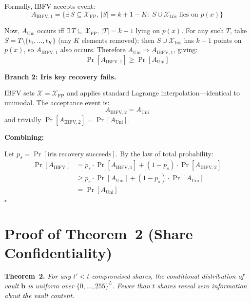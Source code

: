 Formally, IBFV accepts event:
\begin{equation}
  A_\mathrm{IBFV,1} = \{\exists\, S \subseteq \mathcal{X}_{\mathrm{FP}},\,
  |S| = k{+}1{-}K :\; S \cup \mathcal{X}_{\mathrm{Iris}} \text{ lies on } p(x)\}
\end{equation}

Now, $A_\mathrm{Uni}$ occurs iff $\exists\, T \subseteq \mathcal{X}_{\mathrm{FP}},\,
|T| = k{+}1$ lying on $p(x)$. For any such $T$, take $S = T \setminus
\{t_1, \ldots, t_K\}$ (any $K$ elements removed); then $S \cup
\mathcal{X}_{\mathrm{Iris}}$ has $k{+}1$ points on $p(x)$, so $A_\mathrm{IBFV,1}$
also occurs. Therefore $A_\mathrm{Uni} \Rightarrow A_\mathrm{IBFV,1}$, giving:
\begin{equation}
  \Pr[A_\mathrm{IBFV,1}] \geq \Pr[A_\mathrm{Uni}]
\end{equation}

\textbf{Branch 2: Iris key recovery fails.}

IBFV sets $\mathcal{X} = \mathcal{X}_{\mathrm{FP}}$ and applies standard
Lagrange interpolation---identical to unimodal. The acceptance event is:
\begin{equation}
  A_\mathrm{IBFV,2} = A_\mathrm{Uni}
\end{equation}
and trivially $\Pr[A_\mathrm{IBFV,2}] = \Pr[A_\mathrm{Uni}]$.

\textbf{Combining:}

Let $p_s = \Pr[\text{iris recovery succeeds}]$. By the law of total probability:
\begin{align}
  \Pr[A_\mathrm{IBFV}] &= p_s \cdot \Pr[A_\mathrm{IBFV,1}] +
  (1{-}p_s) \cdot \Pr[A_\mathrm{IBFV,2}] \\
  &\geq p_s \cdot \Pr[A_\mathrm{Uni}] + (1{-}p_s) \cdot \Pr[A_\mathrm{Uni}] \\
  &= \Pr[A_\mathrm{Uni}]
\end{align}
\hfill$\square$

\section{Proof of Theorem~2 (Share Confidentiality)}
\label{sec:proof_thm2}

\noindent\textbf{Theorem~2.} \textit{For any $t' < t$ compromised shares, the
conditional distribution of vault $\mathbf{b}$ is uniform over
$\{0, \ldots, 255\}^L$. Fewer than $t$ shares reveal zero information about the
vault content.}

